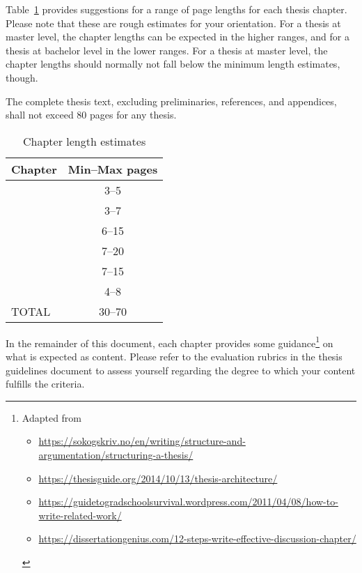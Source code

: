 \documentclass[a4paper,twoside]{bth}
\begin{document}
Table~\ref{tab:pl} provides suggestions for a range of page lengths for each thesis chapter. Please note that these are rough estimates for your orientation. For a thesis at master level, the chapter lengths can be expected in the higher ranges, and for a thesis at bachelor level in the lower ranges. For a thesis at master level, the chapter lengths should normally not fall below the minimum length estimates, though.

The complete thesis text, excluding preliminaries, references, and appendices, shall not exceed 80 pages for any thesis. 

\begin{table}[htb]
    \caption{Chapter length estimates}
    \label{tab:pl}
    \centering
    \begin{tabular}{lc}
        \toprule
        Chapter & Min--Max pages  \\
        \midrule
        \nameref{chp:introduction} & 3--5 \\
        \nameref{chp:relatedwork} & 3--7 \\
        \nameref{chp:method} & 6--15 \\
        \nameref{chp:results} & 7--20 \\
        \nameref{chp:discussion} & 7--15 \\
        \nameref{chp:conclusions} & 4--8 \\
        \midrule
        TOTAL & 30--70 \\
        \bottomrule
    \end{tabular}
\end{table}

In the remainder of this document, each chapter provides some guidance\footnote{Adapted from
\begin{itemize}[nolistsep]
    \item \url{https://sokogskriv.no/en/writing/structure-and-argumentation/structuring-a-thesis/}
    \item \url{https://thesisguide.org/2014/10/13/thesis-architecture/}
    \item \url{https://guidetogradschoolsurvival.wordpress.com/2011/04/08/how-to-write-related-work/}
    \item \url{https://dissertationgenius.com/12-steps-write-effective-discussion-chapter/}
\end{itemize}} on what is expected as content. Please refer to the evaluation rubrics in the thesis guidelines document \cite{guidelines_DP-BTH} to assess yourself regarding the degree to which your content fulfills the criteria.
\end{document}
